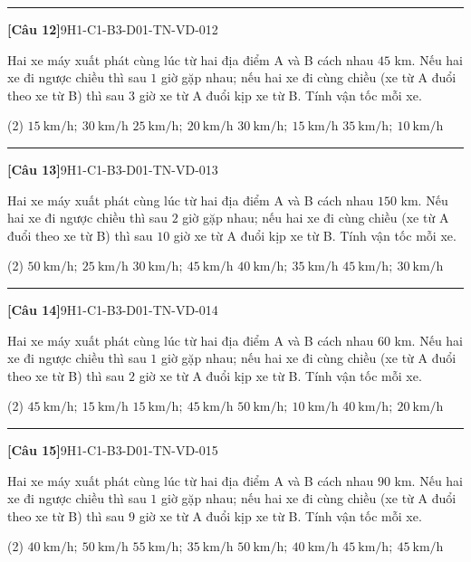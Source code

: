 \documentclass[12pt,a4paper]{article}
\newif\ifloigiai
\newenvironment{cauhoi}[2]{%
  \par\medskip\noindent\rule{\textwidth}{0.4pt}\par\nopagebreak
  \noindent\textbf{[#1]}\hfill{\scriptsize\ttfamily #2}\par\nopagebreak\smallskip}{\par}
\newcommand{\dapan}[1]{\ifloigiai\par\smallskip\noindent\textit{Đáp án:} \textbf{#1}\par\fi}
\begin{document}
\begin{cauhoi}{Câu 12}{9H1-C1-B3-D01-TN-VD-012}
Hai xe máy xuất phát cùng lúc từ hai địa điểm A và B cách nhau $45$ km. Nếu hai xe đi ngược chiều thì sau $1$ giờ gặp nhau; nếu hai xe đi cùng chiều (xe từ A đuổi theo xe từ B) thì sau $3$ giờ xe từ A đuổi kịp xe từ B. Tính vận tốc mỗi xe.
\begin{tasks}(2)
\task $15\ \text{km/h};\ 30\ \text{km/h}$
\task $25\ \text{km/h};\ 20\ \text{km/h}$
\task $30\ \text{km/h};\ 15\ \text{km/h}$
\task $35\ \text{km/h};\ 10\ \text{km/h}$
\end{tasks}
\dapan{C}
\end{cauhoi}
\begin{cauhoi}{Câu 13}{9H1-C1-B3-D01-TN-VD-013}
Hai xe máy xuất phát cùng lúc từ hai địa điểm A và B cách nhau $150$ km. Nếu hai xe đi ngược chiều thì sau $2$ giờ gặp nhau; nếu hai xe đi cùng chiều (xe từ A đuổi theo xe từ B) thì sau $10$ giờ xe từ A đuổi kịp xe từ B. Tính vận tốc mỗi xe.
\begin{tasks}(2)
\task $50\ \text{km/h};\ 25\ \text{km/h}$
\task $30\ \text{km/h};\ 45\ \text{km/h}$
\task $40\ \text{km/h};\ 35\ \text{km/h}$
\task $45\ \text{km/h};\ 30\ \text{km/h}$
\end{tasks}
\dapan{D}
\end{cauhoi}
\begin{cauhoi}{Câu 14}{9H1-C1-B3-D01-TN-VD-014}
Hai xe máy xuất phát cùng lúc từ hai địa điểm A và B cách nhau $60$ km. Nếu hai xe đi ngược chiều thì sau $1$ giờ gặp nhau; nếu hai xe đi cùng chiều (xe từ A đuổi theo xe từ B) thì sau $2$ giờ xe từ A đuổi kịp xe từ B. Tính vận tốc mỗi xe.
\begin{tasks}(2)
\task $45\ \text{km/h};\ 15\ \text{km/h}$
\task $15\ \text{km/h};\ 45\ \text{km/h}$
\task $50\ \text{km/h};\ 10\ \text{km/h}$
\task $40\ \text{km/h};\ 20\ \text{km/h}$
\end{tasks}
\dapan{A}
\end{cauhoi}
\begin{cauhoi}{Câu 15}{9H1-C1-B3-D01-TN-VD-015}
Hai xe máy xuất phát cùng lúc từ hai địa điểm A và B cách nhau $90$ km. Nếu hai xe đi ngược chiều thì sau $1$ giờ gặp nhau; nếu hai xe đi cùng chiều (xe từ A đuổi theo xe từ B) thì sau $9$ giờ xe từ A đuổi kịp xe từ B. Tính vận tốc mỗi xe.
\begin{tasks}(2)
\task $40\ \text{km/h};\ 50\ \text{km/h}$
\task $55\ \text{km/h};\ 35\ \text{km/h}$
\task $50\ \text{km/h};\ 40\ \text{km/h}$
\task $45\ \text{km/h};\ 45\ \text{km/h}$
\end{tasks}
\dapan{C}
\end{cauhoi}
\end{document}
